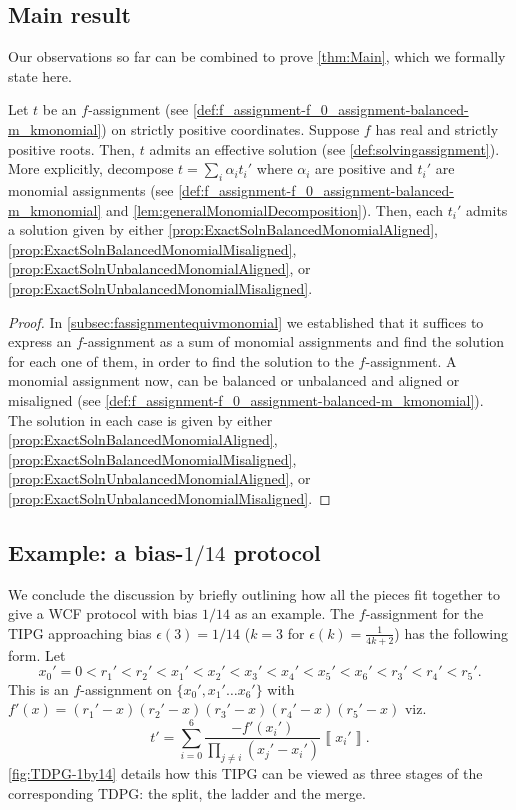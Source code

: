 \documentclass{theoretics}
\newcommand{\atul}[1]{#1} %
\begin{document}
\subsection{Main result}
\label{subsec:mainalgebraic}
Our observations so far can be combined to prove \cref{thm:Main}, which
we formally state here.
\begin{theorem}
  Let $t$ be an $f$-assignment (see \cref{def:f_assignment-f_0_assignment-balanced-m_kmonomial})
  on strictly positive coordinates. %
  Suppose $f$ has real and strictly positive roots. Then, $t$ admits an effective solution (see \cref{def:solvingassignment}). More explicitly, decompose $t=\sum_{i}\alpha_{i}t_{i}'$ where $\alpha_{i}$ are positive and $t_{i}'$ are monomial assignments (see \cref{def:f_assignment-f_0_assignment-balanced-m_kmonomial} and \cref{lem:generalMonomialDecomposition}). Then, each $t_{i}'$ admits a solution
  given by either \cref{prop:ExactSolnBalancedMonomialAligned}, \cref{prop:ExactSolnBalancedMonomialMisaligned},
  \cref{prop:ExactSolnUnbalancedMonomialAligned}, or \cref{prop:ExactSolnUnbalancedMonomialMisaligned}.
\end{theorem}

\begin{proof}
  In \cref{subsec:fassignmentequivmonomial} we established that it suffices to express an $f$-assignment as a sum of monomial assignments and find the solution for each one of them, in order to find the solution to the $f$-assignment. A monomial assignment now, can be balanced or unbalanced and aligned or misaligned (see \cref{def:f_assignment-f_0_assignment-balanced-m_kmonomial}). The solution in each case is given by either
  \cref{prop:ExactSolnBalancedMonomialAligned},
  \cref{prop:ExactSolnBalancedMonomialMisaligned}, \cref{prop:ExactSolnUnbalancedMonomialAligned},
  or \cref{prop:ExactSolnUnbalancedMonomialMisaligned}.
\end{proof}
\subsection{Example: a bias-\texorpdfstring{$1/14$}{1/14} protocol}\label{subsec:1over14}
We conclude the discussion by briefly outlining how all the pieces fit together to give a WCF protocol with bias $1/14$ as an example. The $f$-assignment for the TIPG approaching bias $\epsilon(3)=1/14$
($k=3$ for $\epsilon(k)=\frac{1}{4k+2}$)  has the following
form. Let
\begin{displaymath}
  x_{0}'=0<r_{1}'<r_{2}'<x_{1}'<x_{2}'<x_{3}'<x_{4}'<x_{5}'<x_{6}'<r_{3}'<r_{4}'<r_{5}'.
\end{displaymath}
This is an $f$-assignment
on $\{x_{0}',x_{1}'\dots x_{6}'\}$ with $f'(x)=(r_{1}'-x)(r_{2}'-x)(r_{3}'-x)(r_{4}'-x)(r_{5}'-x)$
viz.
\begin{displaymath}
  t'=\sum_{i=0}^{6}\frac{-f'(x_{i}')}{\prod_{j\neq i}(x_{j}'-x_{i}')}\left\llbracket x_{i}'\right\rrbracket.
\end{displaymath}
\atul{ \cref{fig:TDPG-1by14} details how this TIPG can be viewed as three stages of the corresponding TDPG: the split, the ladder and the merge.}
\end{document}
